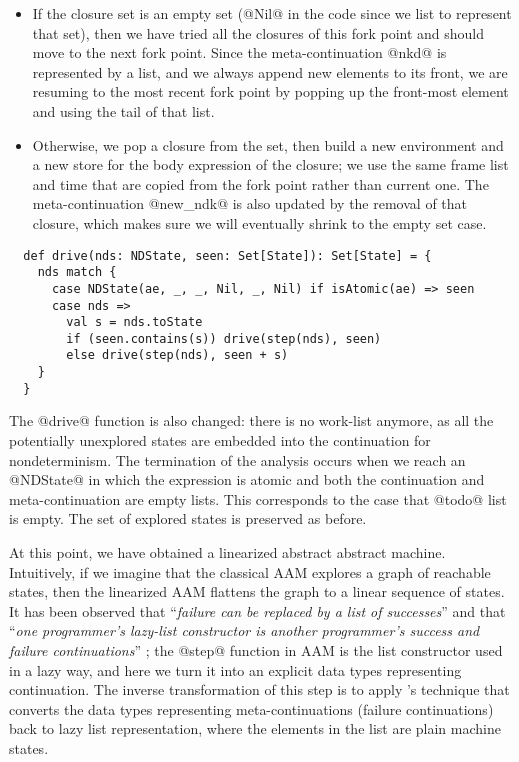 \documentclass[acmsmall, review]{acmart}\settopmatter{}
\begin{document}
\begin{itemize}
  \item If the closure set is an empty set (@Nil@ in the code since we list to represent that set),
then we have tried all the closures of this fork point and should move to the
next fork point. Since the meta-continuation @nkd@ is represented by a list, and we always
append new elements to its front, we are resuming to the most recent fork point by
popping up the front-most element and using the tail of that list.
  \item Otherwise, we pop a closure from the set, then build a new
environment and a new store for the body expression of the closure;
we use the same frame list and time that are copied from the fork point rather
than current one.
The meta-continuation @new_ndk@ is also updated by the removal of that closure, which makes
sure we will eventually shrink to the empty set case.
\end{itemize}

\begin{lstlisting}
  def drive(nds: NDState, seen: Set[State]): Set[State] = {
    nds match {
      case NDState(ae, _, _, Nil, _, Nil) if isAtomic(ae) => seen
      case nds =>
        val s = nds.toState
        if (seen.contains(s)) drive(step(nds), seen)
        else drive(step(nds), seen + s)
    }
  }
\end{lstlisting}

The @drive@ function is also changed: there is no work-list anymore, as all the
potentially unexplored states are embedded into the continuation for
nondeterminism.
The termination of the analysis occurs when we reach an @NDState@ in which the expression
is atomic and both the continuation and meta-continuation are empty lists. This corresponds 
to the case that @todo@ list is empty. The set of explored states is preserved as before.

At this point, we have obtained a linearized abstract abstract machine. 
Intuitively, if we imagine that the classical AAM explores a graph of reachable states, 
then the linearized AAM flattens the graph to a linear sequence of states.
It has been observed that ``\textit{failure can be replaced by a list of successes}''
\cite{10.1007/3-540-15975-4_33} and that ``\textit{one programmer’s lazy-list 
constructor is another programmer’s success and failure continuations}'' \cite{danvy2006a}; 
the @step@ function in AAM is the list constructor used in a lazy way, and here we turn it 
into an explicit data types representing continuation.
The inverse transformation of this step is to apply \citeauthor{10.1007/3-540-15975-4_33}'s 
technique that converts the data types representing meta-continuations (failure continuations) 
back to lazy list representation, where the elements in the list are plain machine states.
\end{document}
